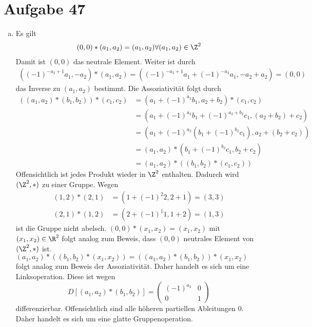 \documentclass{article}
\begin{document}
  \newcommand{\norm}[1]{\lVert #1 \rVert}
  \section*{Aufgabe 47}
  \begin{enumerate}[(a)]
    \item Es gilt
    \begin{align*}
      (0,0) * (a_1, a_2) = (a_1, a_2) \forall (a_1, a_2) \in \Z^2
    \end{align*}
    Damit ist $(0,0)$ das neutrale Element.
    Weiter ist durch
    \begin{align*}
      ((-1)^{-a_2 + 1}a_1, -a_2) * (a_1, a_2) = ((-1)^{-a_2 + 1}a_1 + (-1)^{-a_2}a_1, -a_2 + a_2) = (0,0)
    \end{align*}
    das Inverse zu $(a_1, a_2)$ bestimmt.
    Die Assoziativität folgt durch
    \begin{align*}
      ((a_1, a_2) * (b_1, b_2))*(c_1, c_2) &= (a_1 + (-1)^{a_2}b_1, a_2 + b_2)* (c_1, c_2)\\
      &= (a_1 + (-1)^{a_2}b_1 + (-1)^{a_2 + b_2}c_1, (a_2 + b_2) + c_2)\\
      &= (a_1 + (-1)^{a_2}(b_1 + (-1)^{b_2}c_1), a_2 + (b_2 + c_2))\\
      &= (a_1, a_2) * (b_1 + (-1)^{b_2}c_1, b_2 + c_2)\\
      &= (a_1, a_2) * ((b_1, b_2) * (c_1, c_2))
    \end{align*}
    Offensichtlich ist jedes Produkt wieder in $\Z^2$ enthalten. Dadurch wird $(\Z^2, *)$ zu einer Gruppe. Wegen
    \begin{align*}
      (1, 2)*(2, 1) &= (1 + (-1)^{2}2, 2 + 1) = (3, 3)\\
      (2, 1)*(1, 2) &= (2 + (-1)^{1}1, 1 + 2) = (1, 3)
    \end{align*}
    ist die Gruppe nicht abelsch.
    $(0, 0) * (x_1, x_2) = (x_1, x_2)$ mit $(x_1, x_2) \in \R^2$ folgt analog zum Beweis, dass $(0,0)$ neutrales Element von $(\Z^2, *)$ ist.
    $(a_1, a_2) * ((b_1, b_2) * (x_1, x_2)) = ((a_1, a_2) * (b_1, b_2)) * (x_1, x_2)$ folgt analog zum Beweis der Assoziativität.
    Daher handelt es sich um eine Linksoperation. Diese ist wegen
    \[ 
      D [(a_1, a_2) * (b_1, b_2)] = \begin{pmatrix}
        (-1)^{a_2} & 0\\ 0 & 1
      \end{pmatrix}
    \]
    differenzierbar. Offensichtlich sind alle höheren partiellen Ableitungen $0$.
    Daher handelt es sich um eine glatte Gruppenoperation. 

\end{enumerate}
\end{document}
